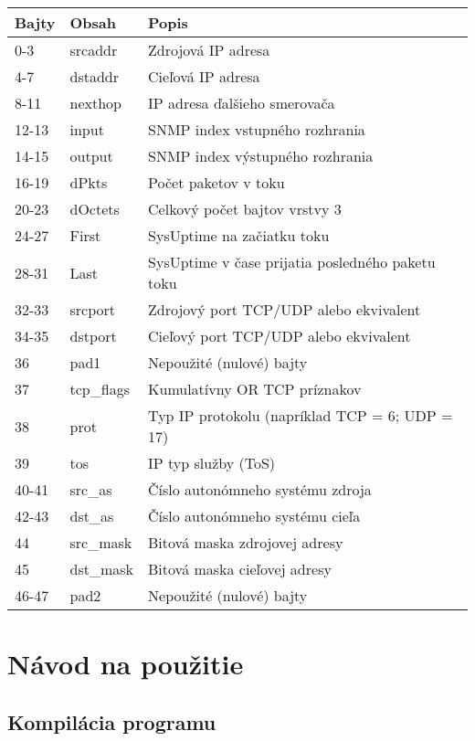 \documentclass[a4paper, 12pt]{article}
\begin{document}
\begin{table}[h]
\centering
\begin{tabular}{|l|l|l|}
\hline
\textbf{Bajty} & \textbf{Obsah} & \textbf{Popis} \\
\hline
0-3 & srcaddr & Zdrojová IP adresa \\
4-7 & dstaddr & Cieľová IP adresa \\
8-11 & nexthop & IP adresa ďalšieho smerovača \\
12-13 & input & SNMP index vstupného rozhrania \\
14-15 & output & SNMP index výstupného rozhrania \\
16-19 & dPkts & Počet paketov v toku \\
20-23 & dOctets & Celkový počet bajtov vrstvy 3 \\
24-27 & First & SysUptime na začiatku toku \\
28-31 & Last & SysUptime v čase prijatia posledného paketu toku \\
32-33 & srcport & Zdrojový port TCP/UDP alebo ekvivalent \\
34-35 & dstport & Cieľový port TCP/UDP alebo ekvivalent \\
36 & pad1 & Nepoužité (nulové) bajty \\
37 & tcp\_flags & Kumulatívny OR TCP príznakov \\
38 & prot & Typ IP protokolu (napríklad TCP = 6; UDP = 17) \\
39 & tos & IP typ služby (ToS) \\
40-41 & src\_as & Číslo autonómneho systému zdroja \\
42-43 & dst\_as & Číslo autonómneho systému cieľa \\
44 & src\_mask & Bitová maska zdrojovej adresy \\
45 & dst\_mask & Bitová maska cieľovej adresy \\
46-47 & pad2 & Nepoužité (nulové) bajty \\
\hline
\end{tabular}
\end{table}


\section{Návod na použitie}
\label{sec:navod_na_pouzitie}

\subsection{Kompilácia programu}
\end{document}
